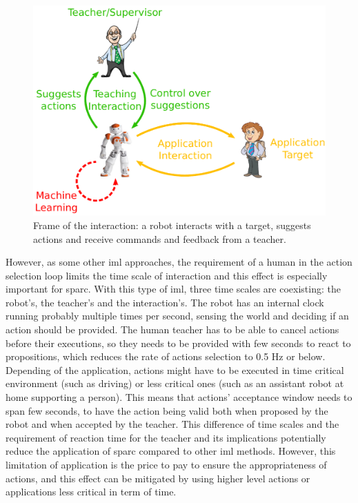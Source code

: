 \begin{figure}[ht]
	\includegraphics[width=.8\linewidth]{frame.pdf}
	\centering
	\caption{Frame of the interaction: a robot interacts with a target, suggests actions and receive commands and feedback from a teacher.}
	\label{fig:frame}
\end{figure}

However, as some other \gls{iml} approaches, the requirement of a human in the action selection loop limits the time scale of interaction and this effect is especially important for \gls{sparc}. With this type of \gls{iml}, three time scales are coexisting: the robot's, the teacher's and the interaction's. The robot has an internal clock running probably multiple times per second, sensing the world and deciding if an action should be provided. The human teacher has to be able to cancel actions before their executions, so they needs to be provided with few seconds to react to propositions, which reduces the rate of actions selection to 0.5 Hz or below. Depending of the application, actions might have to be executed in time critical environment (such as driving) or less critical ones (such as an assistant robot at home supporting a person). This means that actions' acceptance window needs to span few seconds, to have the action being valid both when proposed by the robot and when accepted by the teacher. This difference of time scales and the requirement of reaction time for the teacher and its implications potentially reduce the application of \gls{sparc} compared to other \gls{iml} methods. However, this limitation of application is the price to pay to ensure the appropriateness of actions, and this effect can be mitigated by using higher level actions or applications less critical in term of time.  %


